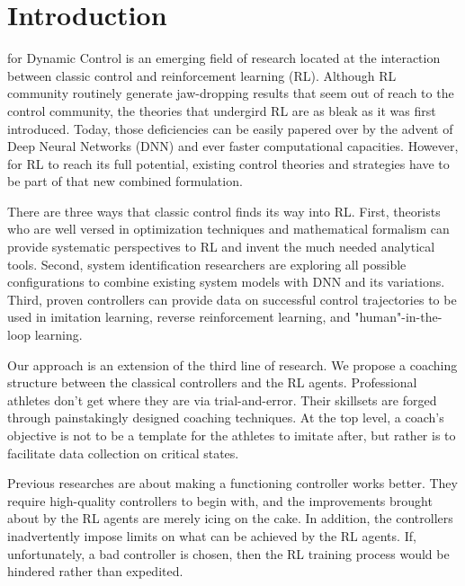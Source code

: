 \documentclass[journal]{IEEEtran}
\begin{document}
\section{Introduction}
 for Dynamic Control is an emerging field of research located at the interaction between classic control and reinforcement learning (RL). Although RL community routinely generate jaw-dropping results that seem out of reach to the control community\cite{Andrychowicz2020LearningDI}\cite{Kalashnikov2018QTOptSD}\cite{Lee2020LearningQL}, the theories that undergird RL are as bleak as it was first introduced\cite{Bertsekas1996NeuroDynamicP}. Today, those deficiencies can be easily papered over by the advent of Deep Neural Networks (DNN) and ever faster computational capacities. However, for RL to reach its full potential, existing control theories and strategies have to be part of that new combined formulation.

There are three ways that classic control finds its way into RL. First, theorists who are well versed in optimization techniques and mathematical formalism can provide systematic perspectives to RL and invent the much needed analytical tools\cite{Han2020ActorCriticRL}\cite{Weinan2017APO}\cite{Dupont2019AugmentedNO}\cite{Betancourt2018OnSO}\cite{Nachum2020ReinforcementLV}. Second, system identification researchers are exploring all possible configurations to combine existing system models with DNN and its variations\cite{Hewing2020LearningBasedMP}\cite{Mohan2020EmbeddingHP}\cite{Lusch2018DeepLF}\cite{Bai2019DeepEM}\cite{BelbutePeres2020CombiningDP}. Third, proven controllers can provide data on successful control trajectories to be used in imitation learning, reverse reinforcement learning, and "human"-in-the-loop learning\cite{Knox2009InteractivelySA}\cite{Knox2010CombiningMF}\cite{Peng2018DeepMimicED}\cite{Peng2020LearningAR}\cite{Paine2018OneShotHI}.

Our approach is an extension of the third line of research. We propose a coaching structure between the classical controllers and the RL agents. Professional athletes don't get where they are via trial-and-error. Their skillsets are forged through painstakingly designed coaching techniques. At the top level, a coach's objective is not to be a template for the athletes to imitate after, but rather is to facilitate data collection on critical states. 

Previous researches\cite{Xie2018LearningWT}\cite{Carlucho2017IncrementalQS}\cite{Pavse2020RIDMRI} are about making a functioning controller works better. They require high-quality controllers to begin with, and the improvements brought about by the RL agents are merely icing on the cake. In addition, the controllers inadvertently impose limits on what can be achieved by the RL agents. If, unfortunately, a bad controller is chosen, then the RL training process would be hindered rather than expedited. 
\end{document}
